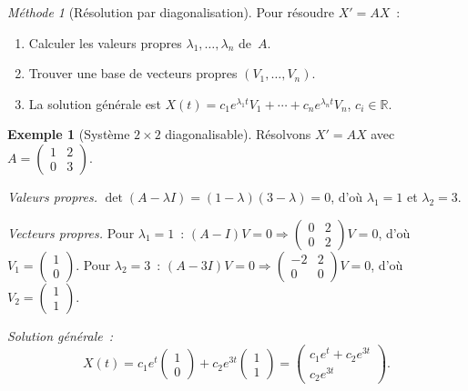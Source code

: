 \documentclass[12pt,a4paper,openany]{book}
\theoremstyle{definition}
\newtheorem{exemple}[definition]{Exemple}
\theoremstyle{plain}
\theoremstyle{remark}
\newtheorem{methode}[definition]{Méthode}
\newcommand{\R}{\mathbb{R}}
\begin{document}
\begin{methode}[Résolution par diagonalisation]\label{meth:diag}
  Pour résoudre $X' = AX$~:
  \begin{enumerate}
    \item Calculer les valeurs propres $\lambda_1,\ldots,\lambda_n$ de~$A$.
    \item Trouver une base de vecteurs propres $(V_1,\ldots,V_n)$.
    \item La solution générale est
      $X(t) = c_1 e^{\lambda_1 t} V_1 + \cdots + c_n e^{\lambda_n t} V_n$,
      $c_i \in \R$.
  \end{enumerate}
\end{methode}

\begin{exemple}[Système $2\times 2$ diagonalisable]\label{ex:syst-2x2-diag}
  Résolvons $X' = AX$ avec $A = \begin{pmatrix} 1 & 2 \\ 0 & 3 \end{pmatrix}$.

  \emph{Valeurs propres.}
  $\det(A - \lambda I) = (1-\lambda)(3-\lambda) = 0$,
  d'où $\lambda_1 = 1$ et $\lambda_2 = 3$.

  \emph{Vecteurs propres.}
  Pour $\lambda_1 = 1$~: $(A - I)V = 0 \Rightarrow
  \begin{pmatrix} 0 & 2 \\ 0 & 2 \end{pmatrix} V = 0$,
  d'où $V_1 = \begin{pmatrix} 1 \\ 0 \end{pmatrix}$.
  Pour $\lambda_2 = 3$~: $(A - 3I)V = 0 \Rightarrow
  \begin{pmatrix} -2 & 2 \\ 0 & 0 \end{pmatrix} V = 0$,
  d'où $V_2 = \begin{pmatrix} 1 \\ 1 \end{pmatrix}$.

  \emph{Solution générale~:}
  \[
    X(t) = c_1 e^t \begin{pmatrix} 1 \\ 0 \end{pmatrix}
         + c_2 e^{3t} \begin{pmatrix} 1 \\ 1 \end{pmatrix}
    = \begin{pmatrix} c_1 e^t + c_2 e^{3t} \\ c_2 e^{3t} \end{pmatrix}.
  \]
\end{exemple}
\end{document}
